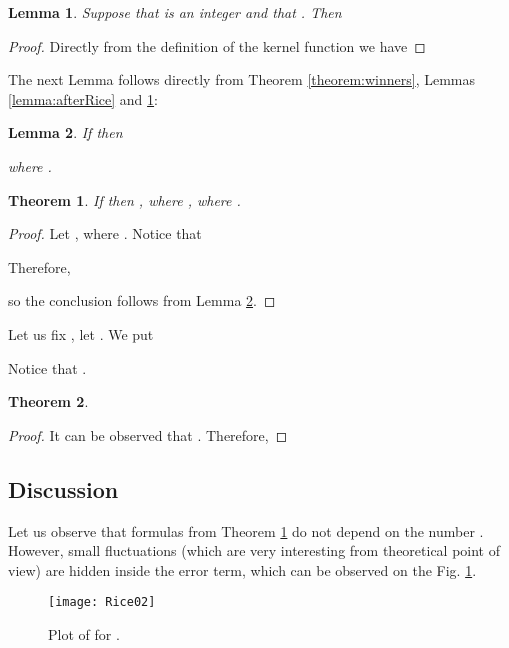 \documentclass[proceedings]{dmtcs}
\newtheorem{lemma}{Lemma}
\newtheorem{theorem}{Theorem}
\begin{document}
\begin{lemma}
\label{lemma:kernelfunction}
Suppose that  is an integer and that . Then

\end{lemma}
\begin{proof}
Directly from the definition of the kernel function  we have

\end{proof}

\noindent
The next Lemma follows directly from Theorem \ref{theorem:winners}, Lemmas \ref{lemma:afterRice} and  \ref{lemma:kernelfunction}:  
\begin{lemma}
\label{lemma:probability}
If  then

where .
\end{lemma}


\begin{theorem} 
\label{thm:finalappro}
If  then 
, where ,
where . 
\end{theorem}

\begin{proof}
Let , where .
Notice that

Therefore,

so the conclusion follows from Lemma \ref{lemma:probability}.
\end{proof}
 
Let  us fix , let . We put

Notice that .
\begin{theorem}
\label{theorem:winnersBound}
 
\end{theorem}
\begin{proof}
It can be observed that .  
Therefore,

\end{proof}

\subsection{Discussion}

Let us observe that formulas from Theorem \ref{thm:finalappro} do not depend on the number . 
However, small fluctuations (which are very interesting from theoretical point of view) are hidden inside the error term, which can be observed on the Fig. \ref{fig:onewinner}.  

\begin{figure}[ht]
\label{fig:onewinner}
\centering
\texttt{[image: Rice02]}
\caption{Plot of  for .}
\end{figure}
\end{document}
